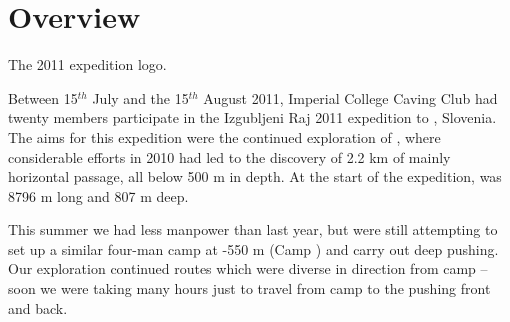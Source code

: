 \section{Overview}


\begin{marginfigure}
\checkoddpage \ifoddpage \forcerectofloat \else \forceversofloat \fi
\centering
 \caption{The 2011 expedition logo. }
 \label{2011 logo}
\end{marginfigure}

Between 15\(^{th}\) July and the 15\(^{th}\) August 2011, Imperial College Caving Club
had twenty members participate in the Izgubljeni Raj 2011 expedition to
, Slovenia. The aims for this expedition were the
continued exploration of , where considerable efforts in
2010 had led to the discovery of 2.2 km of mainly horizontal passage,
all below 500 m in depth. At the start of the expedition,
 was 8796 m long and 807 m deep.

This summer we had less manpower than last year, but were still
attempting to set up a similar four-man camp at -550 m (Camp ) and carry out
deep pushing. Our exploration continued routes which were diverse in
direction from camp -- soon we were taking many hours just to travel from
camp to the pushing front and back.

